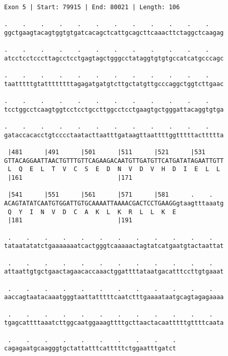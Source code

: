 \documentclass{article}
\begin{document}
\newpage
\begin{Verbatim}
Exon 5 | Start: 79915 | End: 80021 | Length: 106
 
.    .    .    .    .    .    .    .    .    .    .    .    
ggctgaagtacagtggtgtgatcacagctcattgcagcttcaaacttctaggctcaagag
  
.    .    .    .    .    .    .    .    .    .    .    .    
atcctcctcccttagcctcctgagtagctgggcctataggtgtgtgccatcatgcccagc
  
.    .    .    .    .    .    .    .    .    .    .    .    
taatttttgtattttttttagagatgatgtcttgctatgttgcccaggctggtcttgaac
  
.    .    .    .    .    .    .    .    .    .    .    .    
tcctggcctcaagtggtcctcctgccttggcctcctgaagtgctgggattacaggtgtga
  
.    .    .    .    .    .    .    .    .    .    .    .    
gataccacacctgtcccctaatacttaatttgataagttaattttggtttttacttttta
  
 |481      |491      |501      |511      |521      |531     
GTTACAGGAATTAACTGTTTGTTCAGAAGACAATGTTGATGTTCATGATATAGAATTGTT
 L  Q  E  L  T  V  C  S  E  D  N  V  D  V  H  D  I  E  L  L 
 |161                          |171                         
  
 |541      |551      |561      |571      |581      .    .   
ACAGTATATCAATGTGGATTGTGCAAAATTAAAACGACTCCTGAAGGgtaagtttaaatg
 Q  Y  I  N  V  D  C  A  K  L  K  R  L  L  K  E             
 |181                          |191                         
  
 .    .    .    .    .    .    .    .    .    .    .    .   
tataatatatctgaaaaaaatcactgggtcaaaaactagtatcatgaatgtactaattat
  
 .    .    .    .    .    .    .    .    .    .    .    .   
attaattgtgctgaactagaacaccaaactggattttataatgacatttccttgtgaaat
  
 .    .    .    .    .    .    .    .    .    .    .    .   
aaccagtaatacaaatgggtaattatttttcaatctttgaaaataatgcagtagagaaaa
  
 .    .    .    .    .    .    .    .    .    .    .    .   
tgagcattttaaatcttggcaatggaaagttttgcttaactacaatttttgttttcaata
  
 .    .    .    .    .    .    .    .    .    .
cagagaatgcaagggtgctattatttcatttttctggaatttgatct
\end{Verbatim}
\newpage
\end{document}
